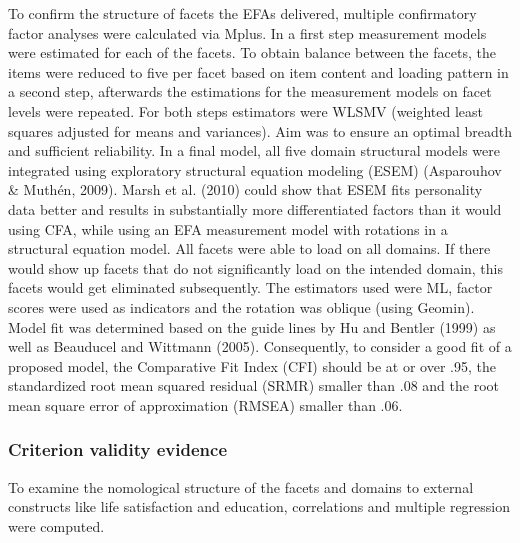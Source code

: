 \documentclass[,man,floatsintext]{apa6}
\theoremstyle{definition}
\theoremstyle{definition}
\theoremstyle{definition}
\theoremstyle{remark}
\begin{document}
To confirm the structure of facets the EFAs delivered, multiple
confirmatory factor analyses were calculated via Mplus. In a first step
measurement models were estimated for each of the facets. To obtain
balance between the facets, the items were reduced to five per facet
based on item content and loading pattern in a second step, afterwards
the estimations for the measurement models on facet levels were
repeated. For both steps estimators were WLSMV (weighted least squares
adjusted for means and variances). Aim was to ensure an optimal breadth
and sufficient reliability. In a final model, all five domain structural
models were integrated using exploratory structural equation modeling
(ESEM) (Asparouhov \& Muthén, 2009). Marsh et al. (2010) could show that
ESEM fits personality data better and results in substantially more
differentiated factors than it would using CFA, while using an EFA
measurement model with rotations in a structural equation model. All
facets were able to load on all domains. If there would show up facets
that do not significantly load on the intended domain, this facets would
get eliminated subsequently. The estimators used were ML, factor scores
were used as indicators and the rotation was oblique (using Geomin).
Model fit was determined based on the guide lines by Hu and Bentler
(1999) as well as Beauducel and Wittmann (2005). Consequently, to
consider a good fit of a proposed model, the Comparative Fit Index (CFI)
should be at or over .95, the standardized root mean squared residual
(SRMR) smaller than .08 and the root mean square error of approximation
(RMSEA) smaller than .06.

\hypertarget{criterion-validity-evidence}{%
\subsubsection{Criterion validity
evidence}\label{criterion-validity-evidence}}

To examine the nomological structure of the facets and domains to
external constructs like life satisfaction and education, correlations
and multiple regression were computed.
\end{document}
